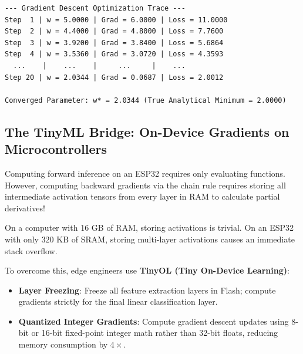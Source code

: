 \begin{lstlisting}[style=outputstyle]
--- Gradient Descent Optimization Trace ---
Step  1 | w = 5.0000 | Grad = 6.0000 | Loss = 11.0000
Step  2 | w = 4.4000 | Grad = 4.8000 | Loss = 7.7600
Step  3 | w = 3.9200 | Grad = 3.8400 | Loss = 5.6864
Step  4 | w = 3.5360 | Grad = 3.0720 | Loss = 4.3593
  ...    |    ...    |     ...     |    ...
Step 20 | w = 2.0344 | Grad = 0.0687 | Loss = 2.0012

Converged Parameter: w* = 2.0344 (True Analytical Minimum = 2.0000)
\end{lstlisting}

\subsection{The TinyML Bridge: On-Device Gradients on Microcontrollers}

\begin{iotbox}
Computing forward inference on an ESP32 requires only evaluating functions. However, computing backward gradients via the chain rule requires storing all intermediate activation tensors from every layer in RAM to calculate partial derivatives!

On a computer with 16 GB of RAM, storing activations is trivial. On an ESP32 with only $320\text{ KB}$ of SRAM, storing multi-layer activations causes an immediate stack overflow. 

To overcome this, edge engineers use \textbf{TinyOL (Tiny On-Device Learning)}:
\begin{itemize}
    \item \textbf{Layer Freezing}: Freeze all feature extraction layers in Flash; compute gradients strictly for the final linear classification layer.
    \item \textbf{Quantized Integer Gradients}: Compute gradient descent updates using 8-bit or 16-bit fixed-point integer math rather than 32-bit floats, reducing memory consumption by $4\times$.
\end{itemize}
\end{iotbox}

